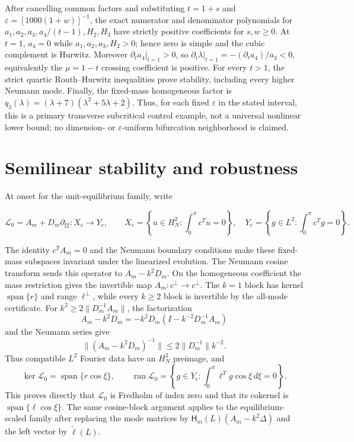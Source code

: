 \documentclass[10pt]{article}
\newif\ifsiadsreview
\newcommand{\1}{\mathbf1}
\begin{document}
After cancelling common factors and substituting
$t=1+s$ and $\varepsilon=[1000(1+w)]^{-1}$, the exact numerator and
denominator polynomials for
$a_1,a_2,a_3,a_4/(t-1),H_2,H_3$ have strictly positive coefficients for
$s,w\ge0$.  At $t=1$, $a_4=0$ while $a_1,a_2,a_3,H_2>0$; hence zero is
simple and the cubic complement is Hurwitz.  Moreover
$\partial_ta_4|_{t=1}>0$, so
$\partial_t\lambda|_{t=1}=-(\partial_ta_4)/a_3<0$, equivalently the
$\mu=1-t$ crossing coefficient is positive.  For every $t>1$, the strict
quartic Routh--Hurwitz inequalities prove stability, including every higher
Neumann mode.  Finally, the fixed-mass homogeneous factor is
$q_3(\lambda)=(\lambda+7)(\lambda^2+5\lambda+2)$.  Thus, for each fixed
$\varepsilon$ in the stated interval, this is a primary transverse
subcritical control example, not a universal nonlinear lower bound; no
dimension- or $\varepsilon$-uniform bifurcation neighborhood is claimed.

\section{Semilinear stability and robustness}

At onset for the unit-equilibrium family, write
\ifsiadsreview
\[
 \mathcal L_0=A_m+D_m\partial_{\xi\xi}:X_c\longrightarrow Y_c,
\]
\[
 \begin{aligned}
 X_c&=\left\{u\in H_N^2:\int_0^\pi c^Tu=0\right\},\\
 Y_c&=\left\{g\in L^2:\int_0^\pi c^Tg=0\right\}.
 \end{aligned}
\]
\else
\[
 \mathcal L_0=A_m+D_m\partial_{\xi\xi}:X_c\longrightarrow Y_c,
 \qquad
 X_c=\left\{u\in H_N^2:\int_0^\pi c^Tu=0\right\},\quad
 Y_c=\left\{g\in L^2:\int_0^\pi c^Tg=0\right\}.
\]
\fi
The identity $c^TA_m=0$ and the Neumann boundary conditions make these
fixed-mass subspaces invariant under the linearized evolution.
The Neumann cosine transform sends this operator to
$A_m-k^2D_m$.  On the homogeneous coefficient the mass restriction gives the
invertible map $A_m:c^\perp\to c^\perp$.  The $k=1$ block has kernel
$\operatorname{span}\{r\}$ and range $\ell^\perp$, while every $k\ge2$ block
is invertible by the all-mode certificate.  For
$k^2\ge2\|D_m^{-1}A_m\|$, the factorization
\[
 A_m-k^2D_m=-k^2D_m(I-k^{-2}D_m^{-1}A_m)
\]
and the Neumann series give
\[
 \|(A_m-k^2D_m)^{-1}\|
 \le 2\|D_m^{-1}\|k^{-2}.
\]
Thus compatible $L^2$ Fourier data have an $H_N^2$ preimage, and
\[
 \ker\mathcal L_0=\operatorname{span}\{r\cos\xi\},\qquad
 \operatorname{ran}\mathcal L_0
 =\left\{g\in Y_c:\int_0^\pi\ell^Tg\cos\xi\,d\xi=0\right\}.
\]
This proves directly that $\mathcal L_0$ is Fredholm of index zero and that
its cokernel is $\operatorname{span}\{\ell\cos\xi\}$.  The same cosine-block
argument applies to the equilibrium-scaled family after replacing the mode
matrices by $\mathsf H_m(L)(A_m-k^2\Delta)$ and the left vector by
$\widetilde\ell(L)$.
\end{document}
